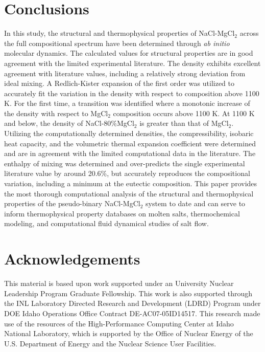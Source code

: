 \documentclass[review]{elsarticle}
\begin{document}
\section{Conclusions}
In this study, the structural and thermophysical properties of NaCl-MgCl$_2$ across the full compositional spectrum have been determined through \textit{ab initio} molecular dynamics. The calculated values for structural properties are in good agreement with the limited experimental literature. The density exhibits excellent agreement with literature values, including a relatively strong deviation from ideal mixing. A Redlich-Kister expansion of the first order was utilized to accurately fit the variation in the density with respect to composition above 1100 K. For the first time, a transition was identified where a monotonic increase of the density with respect to MgCl$_2$ composition occurs above 1100 K. At 1100 K and below, the density of NaCl-80\%MgCl$_2$ is greater than that of MgCl$_2$. Utilizing the computationally determined densities, the compressibility, isobaric heat capacity, and the volumetric thermal expansion coefficient were determined and are in agreement with the limited computational data in the literature. The enthalpy of mixing was determined and over-predicts the single experimental literature value by around 20.6\%, but accurately reproduces the compositional variation, including a minimum at the eutectic composition. This paper provides the most thorough computational analysis of the structural and thermophysical properties of the pseudo-binary NaCl-MgCl$_2$ system to date and can serve to inform thermophysical property databases on molten salts, thermochemical modeling, and computational fluid dynamical studies of salt flow. 


\section{Acknowledgements}

This material is based upon work supported under an University Nuclear Leadership Program Graduate Fellowship. This work is also supported through the INL Laboratory Directed Research and Development (LDRD) Program under DOE Idaho Operations Office Contract DE-AC07-05ID14517. This research made use of the resources of the High-Performance Computing Center at Idaho National Laboratory, which is supported by the Office of Nuclear Energy of the U.S. Department of Energy and the Nuclear Science User Facilities.  


\end{document}

